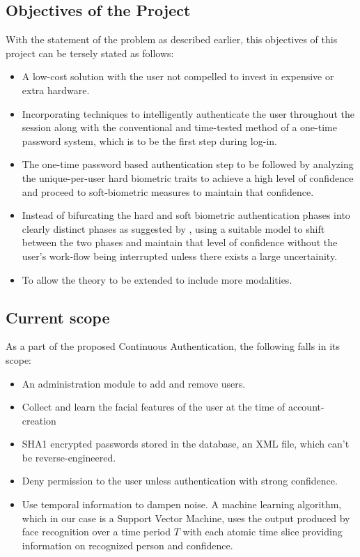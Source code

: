\documentclass[12pt]{article}			%
\begin{document}
\subsection{ Objectives of the Project }
With the statement of the problem as described earlier, this objectives of this project can be tersely stated as follows:
\begin{itemize}
\item A low-cost solution with the user not compelled to invest in expensive or extra hardware.
\item Incorporating techniques to intelligently authenticate the user throughout the session along with the conventional and time-tested method of a one-time password system, which is to be the first step during log-in.
\item The one-time password based authentication step to be followed by analyzing the unique-per-user hard biometric traits to achieve a high level of confidence and proceed to soft-biometric measures to maintain that confidence.
\item Instead of bifurcating the hard and soft biometric authentication phases into clearly distinct phases as suggested by \cite{Niin10}, using a suitable model to shift between the two phases and maintain that level of confidence without the user's work-flow being interrupted unless there exists a large uncertainity.
\item To allow the theory to be extended to include more modalities.
\end{itemize}

\subsection{ Current scope }
As a part of the proposed Continuous Authentication, the following falls in its scope:
\begin{itemize}
	\item An administration module to add and remove users.
	\item Collect and learn the facial features of the user at the time of account-creation
	\item SHA1 encrypted passwords stored in the database, an XML file, which can't be reverse-engineered.
	\item Deny permission to the user unless authentication with strong confidence.
	\item Use temporal information to dampen noise. A machine learning algorithm, which in our case is a Support Vector Machine, uses the output produced by face recognition over a time period $T$ with each atomic time slice providing information on recognized person and confidence.
\end{itemize}
\end{document}
